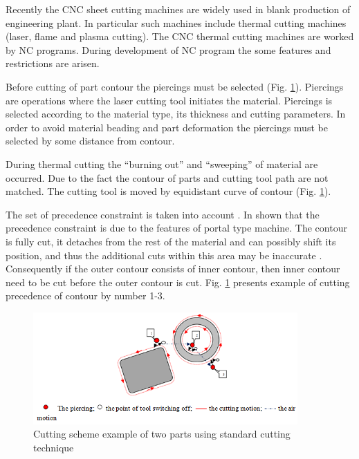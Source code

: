 \documentclass[runningheads]{llncs}
\begin{document}
Recently the CNC sheet cutting machines are widely used in blank production of engineering plant.
In particular such machines include thermal cutting machines (laser, flame and plasma cutting).
The CNC thermal cutting machines are worked by NC programs.
During development of NC program the some features and restrictions are arisen.

Before cutting of part contour the piercings must be selected (Fig. \ref{elements}).
Piercings are operations where the laser cutting tool initiates the material.
Piercings is selected according to the material type, its thickness and cutting parameters.
In order to avoid material beading and part deformation the piercings must be selected by some distance from contour.

During thermal cutting the ``burning out'' and ``sweeping'' of material are occurred.
Due to the fact the contour of parts and cutting tool path are not matched.
The cutting tool is moved by equidistant curve of contour (Fig. \ref{elements}).

The set of precedence constraint is taken into account \cite{ru01}.
In \cite{ru02} shown that the precedence constraint is due to the features of portal type machine.
The contour is fully cut, it detaches from the rest of the material and can possibly shift its position,
and thus the additional cuts within this area may be inaccurate \cite{Dewil2015}.
Consequently if the outer contour consists of inner contour,
then inner contour need to be cut before the outer contour is cut.
Fig. \ref{elements} presents example of cutting precedence of contour by number 1-3.

\begin{figure}
  \begin{center}
  \includegraphics[width=0.9\textwidth]{elements.png}
  \caption{Cutting scheme example of two parts using standard cutting technique}
  \label{elements}
  \end{center}
\end{figure}
\end{document}
